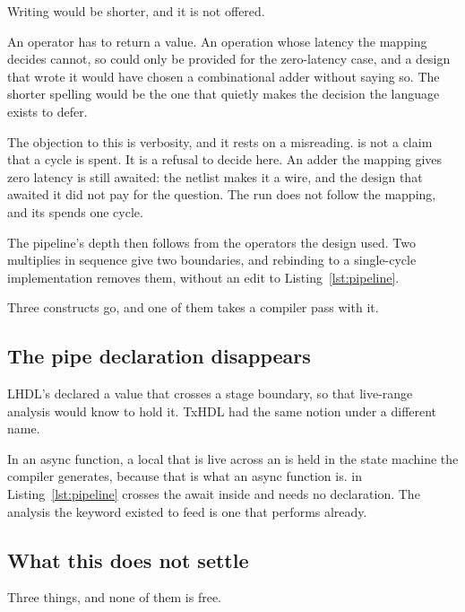 Writing  would be shorter, and it is not offered.

An operator has to return a value. An operation whose latency the mapping
decides cannot, so \code{+} could only be provided for the zero-latency
case, and a design that wrote it would have chosen a combinational adder
without saying so. The shorter spelling would be the one that quietly
makes the decision the language exists to defer.

The objection to this is verbosity, and it rests on a misreading.
 is not a claim that a cycle is spent. It is a refusal to
decide here. An adder the mapping gives zero latency is still awaited:
the netlist makes it a wire, and the design that awaited it did not
pay for the question. The run does not follow the mapping, and its
 spends one cycle.

The pipeline's depth then follows from the operators the design used. Two
multiplies in sequence give two boundaries, and rebinding  to a
single-cycle implementation removes them, without an edit to
Listing~\ref{lst:pipeline}.

Three constructs go, and one of them takes a compiler pass with it.

\subsection{The pipe declaration disappears}

LHDL's  declared a value that crosses a stage boundary, so that
live-range analysis would know to hold it. TxHDL had the same notion under
a different name.

In an async function, a local that is live across an  is held
in the state machine the compiler generates, because that is what an async
function is.  in Listing~\ref{lst:pipeline} crosses the await inside
 and needs no declaration. The analysis the  keyword existed to feed
is one that  performs already.

\subsection{What this does not settle}

Three things, and none of them is free.


